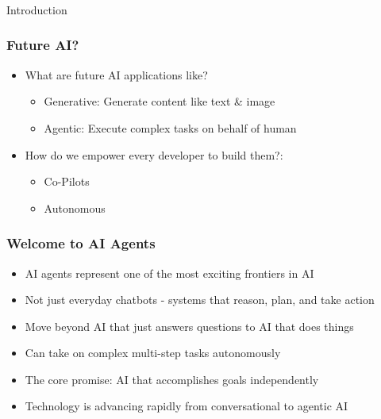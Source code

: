 \begin{frame}[fragile]\frametitle{}
\begin{center}
{\Large Introduction}
\end{center}
\end{frame}


\begin{frame}[fragile]\frametitle{Future AI?}
  \begin{itemize}
    \item What are future AI applications like?
	\begin{itemize}
		\item Generative: Generate content like text \& image
		\item Agentic: Execute complex tasks on behalf of human
	 \end{itemize}
	\item How do we empower every developer to build them?: 
	\begin{itemize}
		\item Co-Pilots
		\item Autonomous
	 \end{itemize}	
  \end{itemize}
\end{frame}

\begin{frame}[fragile]\frametitle{Welcome to AI Agents}
      \begin{itemize}
        \item AI agents represent one of the most exciting frontiers in AI
        \item Not just everyday chatbots - systems that reason, plan, and take action
        \item Move beyond AI that just answers questions to AI that does things
        \item Can take on complex multi-step tasks autonomously
        \item The core promise: AI that accomplishes goals independently
        \item Technology is advancing rapidly from conversational to agentic AI
      \end{itemize}
\end{frame}

